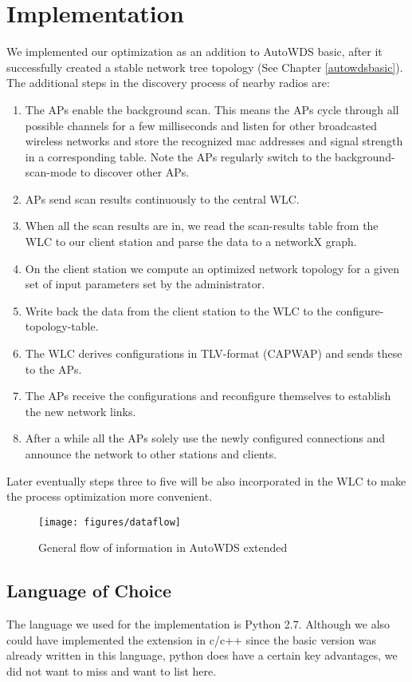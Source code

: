 \chapter{Implementation}
  We implemented our optimization as an addition to AutoWDS basic, after it successfully created a stable network tree topology (See Chapter \ref{autowdsbasic}).
  The additional steps in the discovery process of nearby radios are:
  
  \begin{enumerate}
   \item The APs enable the background scan. This means the APs cycle through all possible channels for a few milliseconds 
    and listen for other broadcasted wireless networks and store the recognized mac addresses and signal strength in a corresponding table.
    Note the APs regularly switch to the background-scan-mode to discover other APs.
   \item APs send scan results continuously to the central \ac{WLC}.
   \item When all the scan results are in, we read the scan-results table from the \ac{WLC} to our client station and parse the data to a networkX graph.
   \item On the client station we compute an optimized network topology for a given set of input parameters set by the administrator. 
   \item Write back the data from the client station to the WLC to the configure-topology-table.
   \item The \ac{WLC} derives configurations in \ac{TLV}-format (\ac{CAPWAP}) and sends these to the APs.
   \item The APs receive the configurations and reconfigure themselves to establish the new network links.
   \item After a while all the APs solely use the newly configured connections and announce the network to other stations and clients.
  \end{enumerate}
  
  Later eventually steps three to five will be also incorporated in the \ac{WLC} to make the process optimization more convenient.
  
  \begin{figure}[h!]
    \centering
    \texttt{[image: figures/dataflow]}
    \caption{General flow of information in AutoWDS extended}
    \label{fig:dataflow}
  \end{figure}

  \section{Language of Choice}
    The language we used for the implementation is Python 2.7. Although we also could have implemented the extension in c/c++ since the basic version
    was already written in this language, python does have a certain key advantages, we did not want to miss and want to list here.
    
